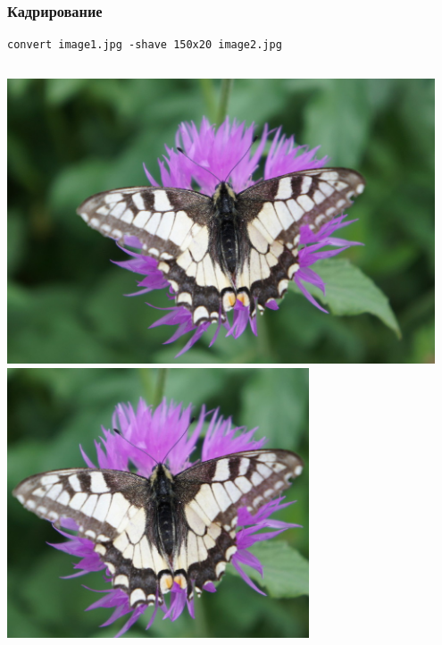 \documentclass[11pt, compress]{beamer}
\begin{document}
\begin{frame}[c, fragile]
\frametitle{Кадрирование}
\begin{lstlisting}
convert image1.jpg -shave 150x20 image2.jpg 
\end{lstlisting}
\begin{columns}
\center
\includegraphics[width=0.95\textwidth]{FLY1000.jpg}
\center
\includegraphics[width=0.67\textwidth]{FLY1000_shaved.jpg}
\end{columns}
\end{frame}
\end{document}

